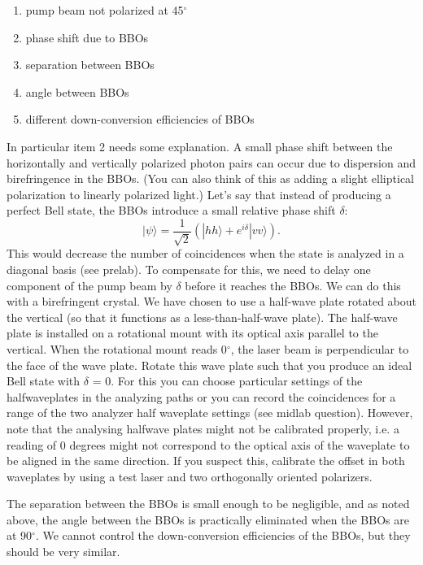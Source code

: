 \documentclass{../lab}
\begin{document}
\begin{enumerate}
    \item pump beam not polarized at 45$^\circ$

    \item phase shift due to BBOs

    \item separation between BBOs

    \item angle between BBOs

    \item different down-conversion efficiencies of BBOs
\end{enumerate}
In particular item 2 needs some explanation. A small phase shift between the horizontally and vertically polarized photon pairs can occur due to dispersion and birefringence in the BBOs. (You can also think of this as adding a slight elliptical polarization to linearly polarized light.) Let's say that instead of producing a perfect Bell state, the BBOs introduce a small relative phase shift $\delta$:
\begin{equation}
    |\psi\rangle = \frac{1}{\sqrt{2}} (|hh\rangle + e^{i\delta} |vv\rangle).
\end{equation}
This would decrease the number of coincidences when the state is analyzed in a diagonal basis (see prelab). To compensate for this, we need to delay one component of the pump beam by $\delta$ before it reaches the BBOs. We can do this with a birefringent crystal. We have chosen to use a half-wave plate rotated about the vertical (so that it functions as a less-than-half-wave plate). The half-wave plate is installed on a rotational mount with its optical axis parallel to the vertical. When the rotational mount reads 0$^\circ$, the laser beam is perpendicular to the face of the wave plate. Rotate this wave plate such that you produce an ideal Bell state with $\delta$ = 0. For this you can choose particular settings of the halfwaveplates in the analyzing paths or you can record the coincidences for a range of the two analyzer half waveplate settings (see midlab question). However, note that the analysing halfwave plates might not be calibrated properly, i.e. a reading of 0 degrees might not correspond to the optical axis of the waveplate to be aligned in the same direction. If you suspect this, calibrate the offset in both waveplates by using a test laser and two orthogonally oriented polarizers.

The separation between the BBOs is small enough to be negligible, and as noted above, the angle between the BBOs is practically eliminated when the BBOs are at 90$^\circ$. We cannot control the down-conversion efficiencies of the BBOs, but they should be very similar.
\end{document}
